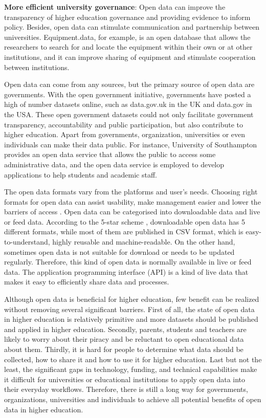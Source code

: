 \textbf{More efficient university governance}: Open data can improve the transparency of higher education governance and providing evidence to inform policy. Besides, open data can stimulate communication and partnership between universities. Equipment.data, for example, is an open database that allows the researchers to search for and locate the equipment within their own or at other institutions, and it can improve sharing of equipment and stimulate cooperation between institutions.

Open data can come from any sources, but the primary source of open data are governments. With the open government initiative, governments have posted a high of number datasets online, such as data.gov.uk in the UK and data.gov in the USA. These open government datasets could not only facilitate government transparency, accountability and public participation, but also contribute to higher education. Apart from governments, organization, universities or even individuals can make their data public. For instance, University of Southampton provides an open data service that allows the public to access some administrative data, and the open data service is employed to develop applications to help students and academic staff. 

The open data formats vary from the platforms and user’s needs. Choosing right formats for open data can assist usability, make management easier and lower the barriers of access \cite{Europeandataportal}. Open data can be categorised into downloadable data and live or feed data. According to the 5-star scheme \cite{berners5star}, downloadable open data has 5 different formats, while most of them are published in CSV format, which is easy-to-understand, highly reusable and machine-readable. On the other hand, sometimes open data is not suitable for download or needs to be updated regularly. Therefore, this kind of open data is normally available in live or feed data. The application programming interface (API) is a kind of live data that makes it easy to efficiently share data and processes. 

Although open data is beneficial for higher education, few benefit can be realized without removing several significant barriers. First of all, the state of open data in higher education is relatively primitive and more datasets should be published and applied in higher education. Secondly, parents, students and teachers are likely to worry about their piracy and be reluctant to open educational data about them. Thirdly, it is hard for people to determine what data should be collected, how to share it and how to use it for higher education. Last but not the least, the significant gaps in technology, funding, and technical capabilities make it difficult for universities or educational institutions to apply open data into their everyday workflows. Therefore, there is still a long way for governments, organizations, universities and individuals to achieve all potential benefits of open data in higher education.



